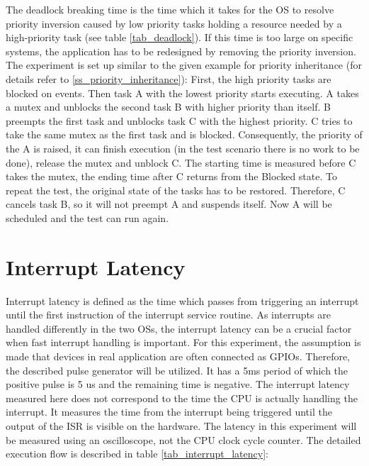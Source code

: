 The deadlock breaking time is the time which it takes for the \ac{OS} to resolve priority inversion caused by low priority tasks holding a resource needed by a high-priority task (see table \ref{tab_deadlock}). 
If this time is too large on specific systems, the application has to be redesigned by removing the priority inversion. 
The experiment is set up similar to the given example for priority inheritance (for details refer to \ref{ss_priority_inheritance}): 
First, the high priority tasks are blocked on events.
Then task A with the lowest priority starts executing.
A takes a mutex and unblocks the second task B with higher priority than itself.
B preempts the first task and unblocks task C with the highest priority. 
C tries to take the same mutex as the first task and is blocked.
Consequently, the priority of the A is raised, it can finish execution (in the test scenario there is no work to be done), release the mutex and unblock C.
The starting time is measured before C takes the mutex, the ending time after C returns from the Blocked state.
To repeat the test, the original state of the tasks has to be restored.
Therefore, C cancels task B, so it will not preempt A and suspends itself.
Now A will be scheduled and the test can run again.

\section{Interrupt Latency}
Interrupt latency is defined as the time which passes from triggering an interrupt until the first instruction of the interrupt service routine. 
As interrupts are handled differently in the two \acp{OS}, the interrupt latency can be a crucial factor when fast interrupt handling is important.
For this  experiment, the assumption is made that devices in real application are often connected as \acp{GPIO}.
Therefore, the described pulse generator will be utilized.
It has a 5ms period of which the positive pulse is 5 us and the remaining time is negative.
The interrupt latency measured here does not correspond to the time the \ac{CPU} is actually handling the interrupt.
It measures the time from the interrupt being triggered until the output of the \ac{ISR} is visible on the hardware.
The latency in this experiment will be measured using an oscilloscope, not the \ac{CPU} clock cycle counter.
The detailed execution flow is described in table \ref{tab_interrupt_latency}:

